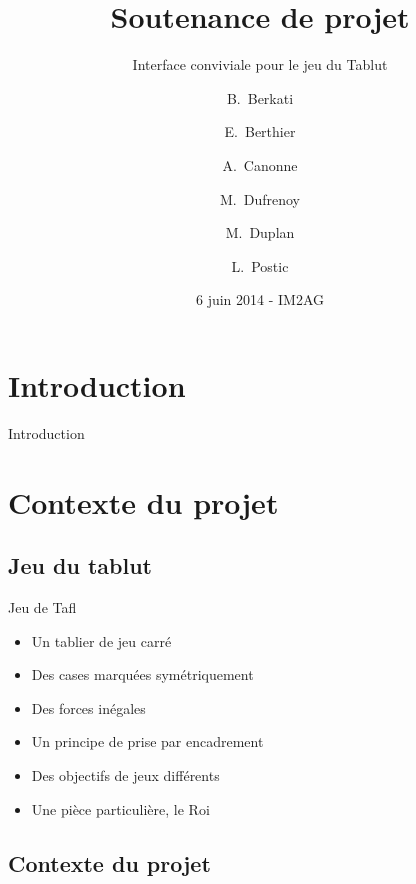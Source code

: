 \documentclass{beamer}
\title[UE PROG6] %
{Soutenance de projet}
\subtitle
{Interface conviviale pour le jeu du Tablut} %
\author[] %
{B.~Berkati \and E.~Berthier \and A.~Canonne \and M.~Dufrenoy \and M.~Duplan \and L.~Postic}
\institute[Universities of Somewhere and Elsewhere] %
{
  IM2AG - Département STS Informatique\\
  Université Joseph Fourier
 }
\date[UET Animation scientifique] %
{6 juin 2014 - IM2AG}
\begin{document}
\begin{frame}
  \titlepage
\end{frame}






\section{Introduction}

\begin{frame}{Introduction}
  \tableofcontents
\end{frame}

\section{Contexte du projet}

\subsection{Jeu du tablut}

\begin{frame}{Jeu de Tafl}
  \begin{itemize}
  \item Un tablier de jeu carré
	\item Des cases marquées symétriquement
	\item Des forces inégales
	\item Un principe de prise par encadrement
	\item Des objectifs de jeux différents
	\item Une pièce particulière, le Roi
  \end{itemize}
\end{frame}

\subsection{Contexte du projet}
\end{document}
